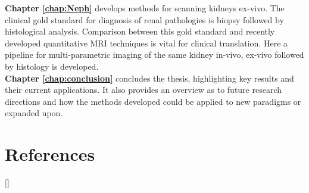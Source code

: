 \textbf{Chapter \ref{chap:Neph}} develops methods for scanning kidneys ex-vivo. The clinical gold standard for diagnosis of renal pathologies is biopsy followed by histological analysis. Comparison between this gold standard and recently developed quantitative \ac{MRI} techniques is vital for clinical translation. Here a pipeline for multi-parametric imaging of the same kidney in-vivo, ex-vivo followed by histology is developed.\\

\textbf{Chapter \ref{chap:conclusion}} concludes the thesis, highlighting key results and their current applications. It also provides an overview as to future research directions and how the methods developed could be applied to new paradigms or expanded upon.\\

\newpage
\section*{References}
[\refname]{}
\printbibliography